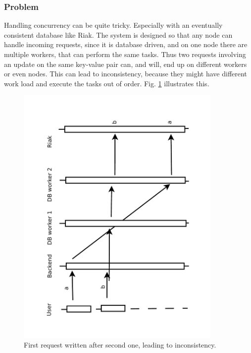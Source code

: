 \documentclass[11pt,a4paper]{report}
\begin{document}
\subsubsection{Problem}
Handling concurrency can be quite tricky.
Especially with an eventually consistent database like Riak.
The system is designed so that any node can handle incoming requests,
since it is database driven, and on one node there are multiple workers,
that can perform the same tasks.
Thus two requests involving an update on the same key-value pair can, and will,
end up on different workers or even nodes.
This can lead to inconsistency, because they might have different work load
and execute the tasks out of order.
Fig. \ref{fig:concurrency:problem_expl} illustrates this.
\begin{figure}[htbp!]
 \centering
 \includegraphics[width=10cm, angle=-90]{./graphics/Concurrency_-_Earlier_session_write_replace_later_session_write.pdf}
 \vspace{-1cm}
 \caption{First request written after second one, leading to inconsistency.}
 \label{fig:concurrency:problem_expl}
\end{figure}
\end{document}
